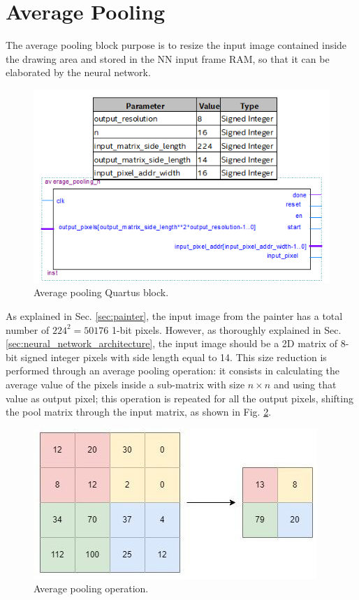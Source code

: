 \documentclass[11pt]{report}
\begin{document}
\section{Average Pooling}\label{sec:average_pooling}
The average pooling block purpose is to resize the input image contained inside the drawing area and stored in the NN input frame RAM, so that it can be elaborated by the neural network.

\begin{figure}[!h]
    \centering
    \includegraphics[width=0.75\linewidth]{images/graphic_interface_design/average_pooling/average_pooling_quartus_block.png}
    \caption{Average pooling Quartus block.}
    \label{fig:avg_pooling_quartus_block.}
\end{figure}

As explained in Sec. \ref{sec:painter}, the input image from the painter has a total number of $224^2=50176$ 1-bit pixels. However, as thoroughly explained in Sec. \ref{sec:neural_network_architecture}, the input image should be a 2D matrix of 8-bit signed integer pixels with side length equal to 14. This size reduction is performed through an average pooling operation: it consists in calculating the average value of the pixels inside a sub-matrix with size $n\times n$ and using that value as output pixel; this operation is repeated for all the output pixels, shifting the pool matrix through the input matrix, as shown in Fig. \ref{fig:avg_pooling_operation}.

\begin{figure}[!h]
    \centering
    \includegraphics[width=0.8\linewidth]{images/graphic_interface_design/average_pooling/avg_pooling_illustration.png}
    \caption{Average pooling operation.}
    \label{fig:avg_pooling_operation}
\end{figure}
\end{document}
